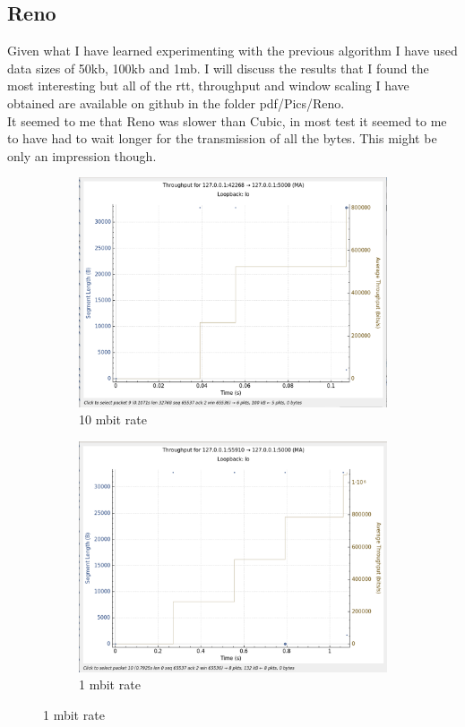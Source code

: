\documentclass{report}
\begin{document}
\subsection*{Reno}
Given what I have learned experimenting with the previous algorithm I have used data sizes of 50kb, 100kb and 1mb. I will discuss the results that I found the most interesting but all of the rtt, throughput and window scaling I have obtained are available on github in the folder pdf/Pics/Reno.\\
It seemed to me that Reno was slower than Cubic, in most test it seemed to me to have had to wait longer for the transmission of all the bytes. This might be only an impression though.\\
\begin{figure}[H]
    \centering
    \begin{subfigure}[b]{0.45\textwidth}
        \centering
        \includegraphics[width=\textwidth]{Pics/Reno/r10mbit_s100k_th}
        \caption{10 mbit rate}
    \end{subfigure}
    \hfill
    \begin{subfigure}[b]{0.45\textwidth}
        \centering
        \includegraphics[width=\textwidth]{Pics/Reno/r1mbit_s100k_th}
        \caption{1 mbit rate}
    \end{subfigure}
    \medskip


\end{figure}
\end{document}
